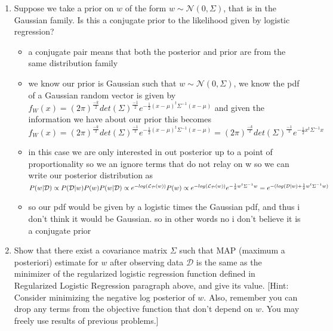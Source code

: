 \documentclass{article}
\theoremstyle{plain}
\theoremstyle{definition}
\begin{document}
\begin{enumerate}
\item Suppose we take a prior on $w$ of the form $w\sim\mathcal{N}(0,\Sigma)$, that is in the Gaussian family. Is this a conjugate prior to the likelihood given by logistic regression?
\begin{itemize}
    \color{blue}
    \item a conjugate pair means that both the posterior and prior are from the same distribution family
    \item we know our prior is Gaussian such that $w\sim\mathcal{N}(0,\Sigma)$, we know the pdf of a Gaussian random vector is given by $f_{W}(x)=(2\pi)^{\frac{-k}{2}}det(\Sigma)^{\frac{-1}{2}}e^{-\frac{1}{2}(x-\mu)^{t}\Sigma^{-1}(x-\mu)}$ and given the information we have about our prior this becomes $f_{W}(x)=(2\pi)^{\frac{-k}{2}}det(\Sigma)^{\frac{-1}{2}}e^{-\frac{1}{2}(x-\mu)^{t}\Sigma^{-1}(x-\mu)}=(2\pi)^{\frac{-k}{2}}det(\Sigma)^{\frac{-1}{2}}e^{-\frac{1}{2}x^{t}\Sigma^{-1}x}$
    \item in this case we are only interested in out posterior up to a point of proportionality so we an ignore terms that do not relay on w so we can write our posterior distribution as $P(w|\mathcal{D})\propto P(\mathcal{D}|w)P(w)P(w|\mathcal{D})\propto e^{-log(\mathcal{L}_{\mathcal{D}}(w))}P(w)\propto  e^{-log(\mathcal{L}_{\mathcal{D}}(w))}e^{-\frac{1}{2}w^{t}\Sigma^{-1}w}\\ =e^{-(log(\mathcal{D}|w)+\frac{1}{2}w^t\Sigma^{-1} w)} $
    \item so our pdf would be given by a logistic times the Gaussian pdf, and thus i don't think it would be Gaussian. so in other words no i don't believe it is a conjugate prior 
\end{itemize}


\item Show that there exist a covariance matrix $\Sigma$ such that MAP (maximum a posteriori) estimate for $w$
after observing data $\mathcal{D}$ is the same as the minimizer of the regularized
logistic regression function defined in Regularized Logistic Regression paragraph above, and give its value. {[}Hint: Consider minimizing the negative log posterior
of $w$. Also, remember you can drop any terms from the objective
function that don't depend on $w$. You may freely use results
of previous problems.{]} 


\end{enumerate}
\end{document}
